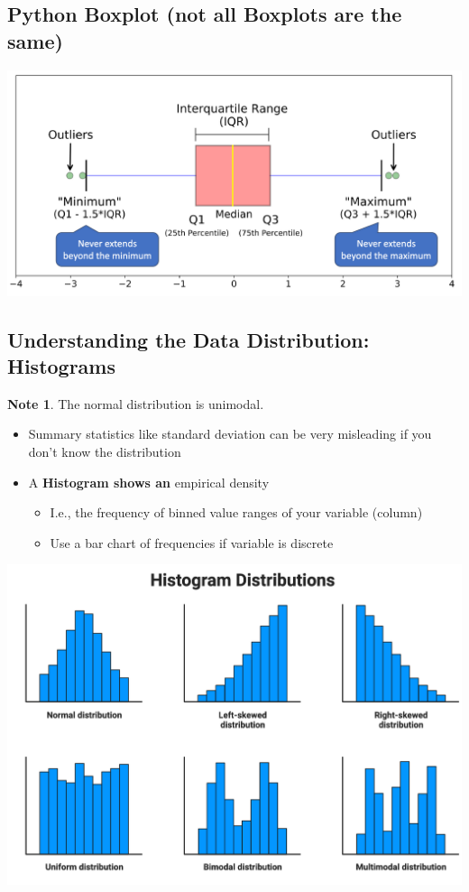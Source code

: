 \documentclass[11pt]{article}
\theoremstyle{definition}
\newtheorem{note}{Note}
\begin{document}
\subsection{Python Boxplot (not all Boxplots are the same)}
\includegraphics[width=\textwidth/2]{9.png}
\subsection{Understanding the Data Distribution: Histograms}
\begin{note}
    The normal distribution is unimodal.
\end{note}
\begin{itemize}
    \item Summary statistics
    like standard deviation
    can be very misleading if
    you don’t know the
    distribution
    \item A \textbf{Histogram shows an}
    empirical density
    \begin{itemize}
        \item I.e., the frequency of
        binned value ranges of
        your variable (column)
        \item Use a bar chart of
        frequencies if variable is
        discrete
    \end{itemize}
\end{itemize}
\includegraphics[width=\textwidth]{10.png}
\end{document}
